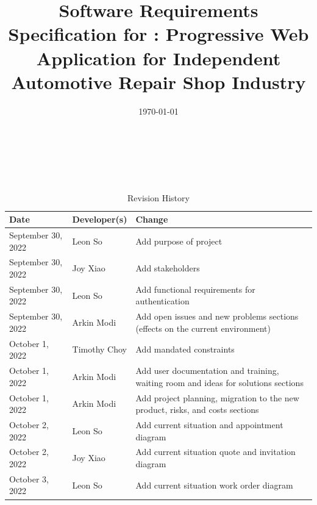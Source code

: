 \documentclass[12pt]{article}
\begin{document}
\title{Software Requirements Specification for \progname: Progressive Web Application for Independent
	Automotive Repair Shop Industry}
\author{\authname}
\date{\today}

\maketitle

~\newpage


\tableofcontents

~\newpage

\begin{table}[H]
	\caption{Revision History} \label{TblRevisionHistory}
	\begin{tabularx}{\textwidth}{llX}
		\toprule
		\textbf{Date}      & \textbf{Developer(s)} & \textbf{Change}                                                                    \\
		\midrule
		September 30, 2022 & Leon So               & Add purpose of project                                                             \\
		September 30, 2022 & Joy Xiao              & Add stakeholders                                                                   \\
		September 30, 2022 & Leon So               & Add functional requirements for authentication                                     \\
		September 30, 2022 & Arkin Modi            & Add open issues and new problems sections (effects on the current environment)     \\
		October 1, 2022    & Timothy Choy          & Add mandated constraints                                                           \\
		October 1, 2022    & Arkin Modi            & Add user documentation and training, waiting room and ideas for solutions sections \\
		October 1, 2022    & Arkin Modi            & Add project planning, migration to the new product, risks, and costs sections      \\
		October 2, 2022    & Leon So               & Add current situation and appointment diagram                                      \\
		October 2, 2022    & Joy Xiao              & Add current situation quote and invitation diagram                                 \\
		October 3, 2022    & Leon So               & Add current situation work order diagram                                           \\

\end{tabularx}
\end{table}
\end{document}
